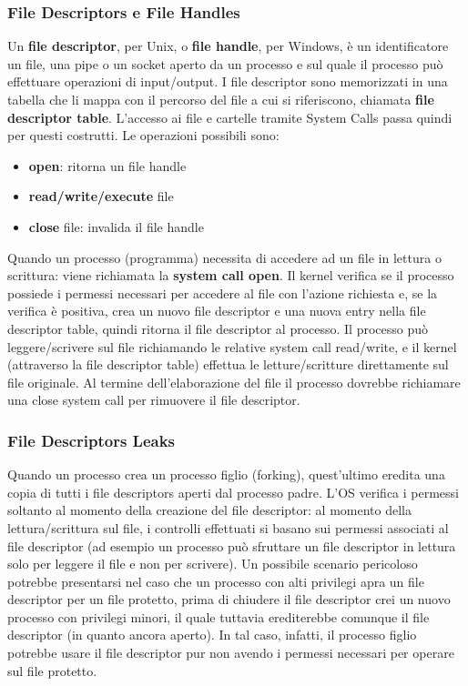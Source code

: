 \subsubsection{File Descriptors e File Handles}
Un \textbf{file descriptor}, per Unix, o \textbf{file handle}, per Windows, è un identificatore un file, una pipe o un socket aperto da un processo e sul quale il processo può effettuare operazioni di input/output. I file descriptor sono memorizzati in una tabella che li mappa con il percorso del file a cui si riferiscono, chiamata \textbf{file descriptor table}. L'accesso ai file e cartelle tramite System Calls passa quindi per questi costrutti. Le operazioni possibili sono:
\begin{itemize}
  \item \textbf{open}: ritorna un file handle
  \item \textbf{read/write/execute} file
  \item \textbf{close} file: invalida il file handle
\end{itemize}
Quando un processo (programma) necessita di accedere ad un file in lettura o scrittura: viene richiamata la \textbf{system call open}. Il kernel verifica se il processo possiede i permessi necessari per accedere al file con l'azione richiesta e, se la verifica è positiva, crea un nuovo file descriptor e una nuova entry nella file descriptor table, quindi ritorna il file descriptor al processo. Il processo può leggere/scrivere sul file richiamando le relative system call read/write, e il kernel (attraverso la file descriptor table) effettua le letture/scritture direttamente sul file originale. Al termine dell'elaborazione del file il processo dovrebbe richiamare una close system call
per rimuovere il file descriptor.

\subsubsection{File Descriptors Leaks}
Quando un processo crea un processo figlio (forking), quest'ultimo eredita una copia di tutti i file descriptors aperti dal processo padre. L'OS verifica i permessi soltanto al momento della creazione del file descriptor: al momento della lettura/scrittura sul file, i controlli effettuati si basano sui permessi associati al file descriptor (ad esempio un processo può sfruttare un file descriptor in lettura solo per leggere il file e non per scrivere). Un possibile scenario pericoloso potrebbe presentarsi nel caso che un processo con alti privilegi apra un file descriptor per un file protetto, prima di chiudere il file descriptor crei un nuovo processo con privilegi minori, il quale tuttavia erediterebbe comunque il file descriptor (in quanto ancora aperto). In tal caso, infatti, il processo figlio potrebbe usare il file descriptor pur non avendo i permessi necessari per operare sul file protetto.

